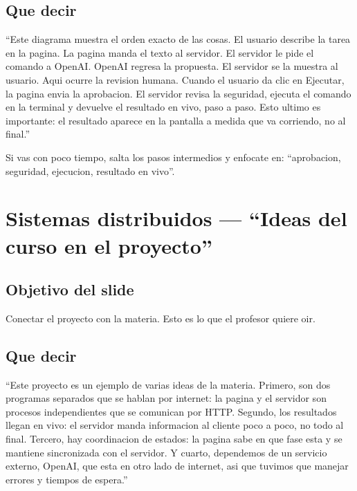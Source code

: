 \documentclass[12pt,a4paper]{article}
\begin{document}
\subsection{Que decir}
\begin{frasebox}
``Este diagrama muestra el orden exacto de las cosas. El usuario describe la tarea en la pagina. La pagina manda el texto al servidor. El servidor le pide el comando a OpenAI. OpenAI regresa la propuesta. El servidor se la muestra al usuario. Aqui ocurre la revision humana. Cuando el usuario da clic en Ejecutar, la pagina envia la aprobacion. El servidor revisa la seguridad, ejecuta el comando en la terminal y devuelve el resultado en vivo, paso a paso. Esto ultimo es importante: el resultado aparece en la pantalla a medida que va corriendo, no al final.''
\end{frasebox}

\begin{tipbox}
Si vas con poco tiempo, salta los pasos intermedios y enfocate en: ``aprobacion, seguridad, ejecucion, resultado en vivo''.
\end{tipbox}

\section{Sistemas distribuidos --- ``Ideas del curso en el proyecto''}
\subsection{Objetivo del slide}
Conectar el proyecto con la materia. Esto es lo que el profesor quiere oir.

\subsection{Que decir}
\begin{frasebox}
``Este proyecto es un ejemplo de varias ideas de la materia. Primero, son dos programas separados que se hablan por internet: la pagina y el servidor son procesos independientes que se comunican por HTTP. Segundo, los resultados llegan en vivo: el servidor manda informacion al cliente poco a poco, no todo al final. Tercero, hay coordinacion de estados: la pagina sabe en que fase esta y se mantiene sincronizada con el servidor. Y cuarto, dependemos de un servicio externo, OpenAI, que esta en otro lado de internet, asi que tuvimos que manejar errores y tiempos de espera.''
\end{frasebox}
\end{document}
